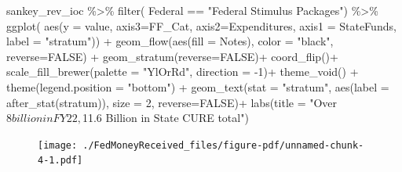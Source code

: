 \documentclass[
  letterpaper,
  DIV=11,
  numbers=noendperiod]{scrreport}
\newenvironment{Shaded}{\begin{snugshade}}{\end{snugshade}}
\newcommand{\AttributeTok}[1]{\textcolor[rgb]{0.40,0.45,0.13}{#1}}
\newcommand{\ConstantTok}[1]{\textcolor[rgb]{0.56,0.35,0.01}{#1}}
\newcommand{\DecValTok}[1]{\textcolor[rgb]{0.68,0.00,0.00}{#1}}
\newcommand{\FunctionTok}[1]{\textcolor[rgb]{0.28,0.35,0.67}{#1}}
\newcommand{\NormalTok}[1]{\textcolor[rgb]{0.00,0.23,0.31}{#1}}
\newcommand{\SpecialCharTok}[1]{\textcolor[rgb]{0.37,0.37,0.37}{#1}}
\newcommand{\StringTok}[1]{\textcolor[rgb]{0.13,0.47,0.30}{#1}}
\begin{document}
\begin{Shaded}
\begin{Highlighting}[]
\NormalTok{sankey\_rev\_ioc }\SpecialCharTok{\%\textgreater{}\%} \FunctionTok{filter}\NormalTok{( Federal }\SpecialCharTok{==} \StringTok{"Federal Stimulus Packages"}\NormalTok{) }\SpecialCharTok{\%\textgreater{}\%}
\FunctionTok{ggplot}\NormalTok{( }
       \FunctionTok{aes}\NormalTok{(}\AttributeTok{y =}\NormalTok{ value, }
            \AttributeTok{axis3=}\NormalTok{FF\_Cat, }\AttributeTok{axis2=}\NormalTok{Expenditures, }\AttributeTok{axis1 =}\NormalTok{ StateFunds, }\AttributeTok{label =} \StringTok{"stratum"}\NormalTok{)) }\SpecialCharTok{+}
  \FunctionTok{geom\_flow}\NormalTok{(}\FunctionTok{aes}\NormalTok{(}\AttributeTok{fill =}\NormalTok{ Notes), }\AttributeTok{color =} \StringTok{"black"}\NormalTok{, }\AttributeTok{reverse=}\ConstantTok{FALSE}\NormalTok{) }\SpecialCharTok{+}
  \FunctionTok{geom\_stratum}\NormalTok{(}\AttributeTok{reverse=}\ConstantTok{FALSE}\NormalTok{)}\SpecialCharTok{+}
\FunctionTok{coord\_flip}\NormalTok{()}\SpecialCharTok{+}
   \FunctionTok{scale\_fill\_brewer}\NormalTok{(}\AttributeTok{palette =} \StringTok{"YlOrRd"}\NormalTok{, }\AttributeTok{direction =} \SpecialCharTok{{-}}\DecValTok{1}\NormalTok{)}\SpecialCharTok{+}
  \FunctionTok{theme\_void}\NormalTok{() }\SpecialCharTok{+}
  \FunctionTok{theme}\NormalTok{(}\AttributeTok{legend.position =} \StringTok{"bottom"}\NormalTok{) }\SpecialCharTok{+} 
      \FunctionTok{geom\_text}\NormalTok{(}\AttributeTok{stat =} \StringTok{"stratum"}\NormalTok{, }\FunctionTok{aes}\NormalTok{(}\AttributeTok{label =} \FunctionTok{after\_stat}\NormalTok{(stratum)), }\AttributeTok{size =} \DecValTok{2}\NormalTok{, }\AttributeTok{reverse=}\ConstantTok{FALSE}\NormalTok{)}\SpecialCharTok{+}
  \FunctionTok{labs}\NormalTok{(}\AttributeTok{title =} \StringTok{"Over $8 billion in FY22, $11.6 Billion in State CURE total"}\NormalTok{)}
\end{Highlighting}
\end{Shaded}

\begin{figure}[H]

{\centering \texttt{[image: ./FedMoneyReceived\_files/figure-pdf/unnamed-chunk-4-1.pdf]}

}

\end{figure}
\end{document}
